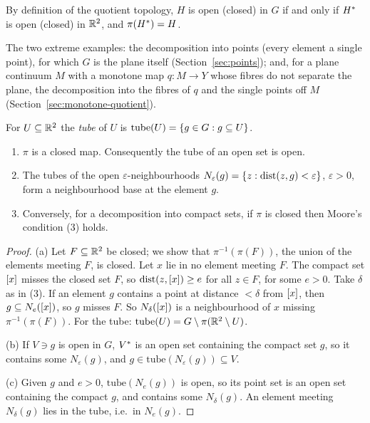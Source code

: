 
By definition of the quotient topology, $H$ is open (closed) in $G$ if and only if $H^{\ast}$ is open
(closed) in $\mathbb{R}^2$, and $\pi(H^{\ast})=H$.

The two extreme examples: the decomposition into points (every element a single point), for which
$G$ is the plane itself (Section~\ref{sec:points}); and, for a plane continuum $M$ with a monotone map
$q\colon M\to Y$ whose fibres do not separate the plane, the decomposition into the fibres of $q$ and
the single points off $M$ (Section~\ref{sec:monotone-quotient}).

\begin{definition}\label{def:tube}
For $U\subseteq\mathbb{R}^2$ the \emph{tube} of $U$ is $\mathrm{tube}(U)=\left\{ g\in G:g\subseteq U \right\}$.
\end{definition}


\begin{proposition}\label{prop:closed-map}
\leavevmode
\begin{enumerate}[label=(\alph*)]
\item $\pi$ is a closed map. Consequently the tube of an open set is open.
\item The tubes of the open $\varepsilon$-neighbourhoods $N_\varepsilon(g)=\left\{ z:\operatorname{dist}(z,g)<\varepsilon \right\}$,
$\varepsilon>0$, form a neighbourhood base at the element $g$.
\item Conversely, for a decomposition into compact sets, if $\pi$ is closed then Moore's condition
(3) holds.
\end{enumerate}
\end{proposition}

\begin{proof}
(a) Let $F\subseteq\mathbb{R}^2$ be closed; we show that $\pi^{-1}(\pi(F))$, the union of the elements meeting
$F$, is closed. Let $x$ lie in no element meeting $F$. The compact set $[x]$ misses the closed set
$F$, so $\operatorname{dist}(z,[x])\ge e$ for all $z\in F$, for some $e>0$. Take $\delta$ as in (3). If an element
$g$ contains a point at distance $<\delta$ from $[x]$, then $g\subseteq N_e([x])$, so $g$ misses
$F$. So $N_\delta([x])$ is a neighbourhood of $x$ missing $\pi^{-1}(\pi(F))$. For the tube:
$\mathrm{tube}(U)=G\setminus\pi(\mathbb{R}^2\setminus U)$.

(b) If $V\ni g$ is open in $G$, $V^{\ast}$ is an open set containing the compact set $g$, so it contains
some $N_\varepsilon(g)$, and $g\in\mathrm{tube}(N_\varepsilon(g))\subseteq V$.

(c) Given $g$ and $e>0$, $\mathrm{tube}(N_e(g))$ is open, so its point set is an open set containing
the compact $g$, and contains some $N_\delta(g)$. An element meeting $N_\delta(g)$ lies in the tube,
i.e.\ in $N_e(g)$.
\end{proof}

